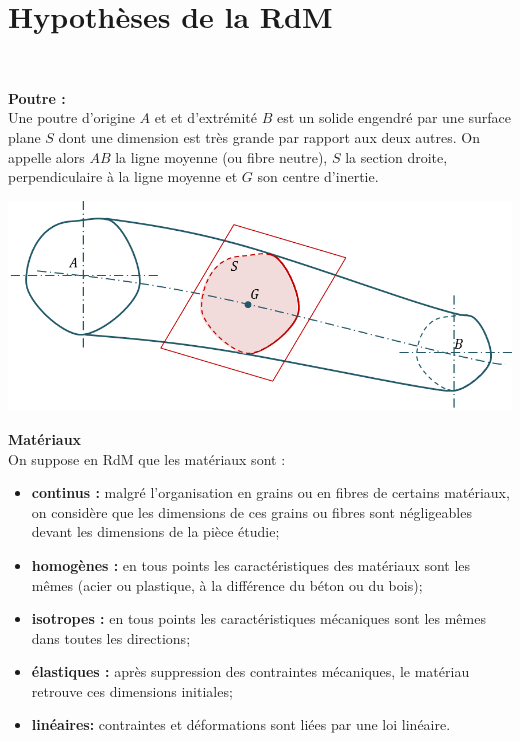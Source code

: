 \documentclass[10pt,fleqn]{article} %
\begin{document}

\vspace{2cm}
\pagestyle{fancy}
\thispagestyle{plain}

\section{Hypothèses de la RdM}
\begin{defi}~\\

\noindent\begin{minipage}[c]{.65\linewidth}
\textbf{Poutre :} \\Une poutre d'origine $A$ et et d'extrémité $B$ est un solide engendré par une surface plane $S$ dont une dimension est très grande par rapport aux deux autres. On appelle alors $AB$ la ligne moyenne (ou fibre neutre), $S$ la section droite, perpendiculaire à la ligne moyenne et  $G$ son centre d'inertie. 
\end{minipage} \hfill
\begin{minipage}[c]{.3\linewidth}
\begin{center}
\includegraphics[width=\linewidth]{images/Poutre}
\end{center}
\end{minipage}
\end{defi}

\begin{hypo}
\textbf{Matériaux} \\
On suppose en RdM que les matériaux sont :
\begin{itemize}
\item \textbf{continus :} malgré l'organisation en grains ou en fibres de certains matériaux, on considère que les dimensions de ces grains ou fibres sont négligeables devant les dimensions de la pièce étudie;
\item \textbf{homogènes :} en tous points  les caractéristiques des matériaux sont les mêmes (acier ou plastique, à la différence du béton ou du bois);
\item \textbf{isotropes :} en tous points les caractéristiques mécaniques sont les mêmes dans toutes les directions;
\item \textbf{élastiques :} après suppression des contraintes mécaniques, le matériau retrouve ces dimensions initiales;
\item \textbf{linéaires:} contraintes et déformations sont liées par une loi linéaire.
\end{itemize}
\end{hypo}
\end{document}
